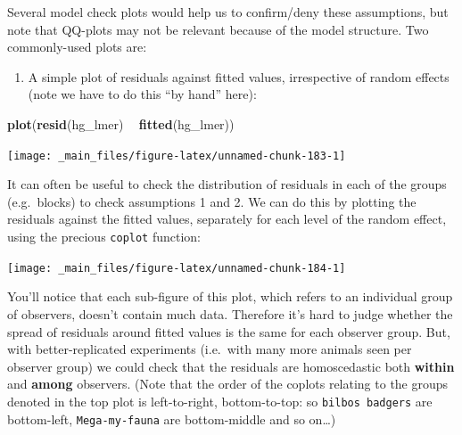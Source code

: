 \documentclass[]{book}
\newenvironment{Shaded}{\begin{snugshade}}{\end{snugshade}}
\newcommand{\KeywordTok}[1]{\textcolor[rgb]{0.13,0.29,0.53}{\textbf{#1}}}
\newcommand{\StringTok}[1]{\textcolor[rgb]{0.31,0.60,0.02}{#1}}
\newcommand{\OperatorTok}[1]{\textcolor[rgb]{0.81,0.36,0.00}{\textbf{#1}}}
\newcommand{\NormalTok}[1]{#1}
\providecommand{\tightlist}{%
  \setlength{\itemsep}{0pt}\setlength{\parskip}{0pt}}
\theoremstyle{definition}
\theoremstyle{definition}
\theoremstyle{definition}
\theoremstyle{remark}
\begin{document}
Several model check plots would help us to confirm/deny these
assumptions, but note that QQ-plots may not be relevant because of the
model structure. Two commonly-used plots are:

\begin{enumerate}
\def\labelenumi{\arabic{enumi}.}
\tightlist
\item
  A simple plot of residuals against fitted values, irrespective of
  random effects (note we have to do this ``by hand'' here):
\end{enumerate}

\begin{Shaded}
\begin{Highlighting}[]
\KeywordTok{plot}\NormalTok{(}\KeywordTok{resid}\NormalTok{(hg_lmer) }\OperatorTok{~}\StringTok{ }\KeywordTok{fitted}\NormalTok{(hg_lmer))}
\end{Highlighting}
\end{Shaded}

\begin{center}\texttt{[image: \_main\_files/figure-latex/unnamed-chunk-183-1]} \end{center}

It can often be useful to check the distribution of residuals in each of
the groups (e.g.~blocks) to check assumptions 1 and 2. We can do this by
plotting the residuals against the fitted values, separately for each
level of the random effect, using the precious \texttt{coplot} function:

\begin{Shaded}
\end{Shaded}

\begin{center}\texttt{[image: \_main\_files/figure-latex/unnamed-chunk-184-1]} \end{center}

You'll notice that each sub-figure of this plot, which refers to an
individual group of observers, doesn't contain much data. Therefore it's
hard to judge whether the spread of residuals around fitted values is
the same for each observer group. But, with better-replicated
experiments (i.e.~with many more animals seen per observer group) we
could check that the residuals are homoscedastic both \textbf{within}
and \textbf{among} observers. (Note that the order of the coplots
relating to the groups denoted in the top plot is left-to-right,
bottom-to-top: so \texttt{bilbo\textquotesingle{}s\ badgers} are
bottom-left, \texttt{Mega-my-fauna} are bottom-middle and so on\ldots{})
\end{document}
